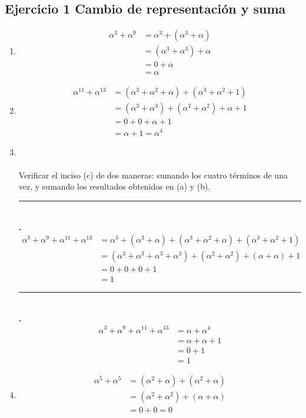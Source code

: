 \documentclass[11pt,fleqn]{article}
\begin{document}
\subsection*{Ejercicio 1 Cambio de representación y suma}
\begin{enumerate}[label=\alph*)]
\item {}
\begin{align*}
    \alpha^3+\alpha^9
    &=\alpha^3+(\alpha^3+\alpha)\\
    &=(\alpha^3+\alpha^3)+\alpha\\
    &=0+\alpha\\
    &=\alpha
\end{align*}

\item {}
\begin{align*}
    \alpha^{11}+\alpha^{13}
    &=(\alpha^3+\alpha^2+\alpha)+(\alpha^3+\alpha^2+1)\\
    &=(\alpha^3+\alpha^3)+(\alpha^2+\alpha^2)+\alpha+1\\
    &=0+0+\alpha+1\\
    &=\alpha+1=\alpha^4
\end{align*}

\item {}\\ \\
Verificar el inciso (c) de dos maneras: sumando los cuatro términos de una vez, y sumando los
resultados obtenidos en (a) y (b).\\
\rule{4cm}{0.4pt}\\\textbf{\textbar {}.}
\begin{align*}
    \alpha^3+\alpha^9+\alpha^{11}+\alpha^{13}
    &=\alpha^3+(\alpha^3+\alpha)+(\alpha^3+\alpha^2+\alpha)+(\alpha^3+\alpha^2+1)\\
    &=(\alpha^3+\alpha^3+\alpha^3+\alpha^3)
    +(\alpha^2+\alpha^2)
    +(\alpha+\alpha)
    +1\\
    &=0+0+0+1\\
    &=1
\end{align*}
\rule{4cm}{0.4pt}\\\textbf{\textbar {}.}
\begin{align*}
    \alpha^3+\alpha^9+\alpha^{11}+\alpha^{13}
    &=\alpha+\alpha^4\\
    &=\alpha+\alpha+1\\
    &=0+1\\
    &=1
\end{align*}

\item {}
\begin{align*}
    \alpha^5+\alpha^5
    &=(\alpha^2+\alpha)+(\alpha^2+\alpha)\\
    &=(\alpha^2+\alpha^2)+(\alpha+\alpha)\\
    &=0+0=0\\
\end{align*}
\end{enumerate}
\end{document}

